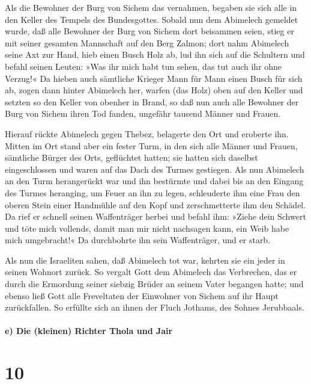 Als die Bewohner der Burg von Sichem das vernahmen,
begaben sie sich alle in den Keller des Tempels des Bundesgottes.
Sobald nun dem Abimelech gemeldet wurde, daß alle
Bewohner der Burg von Sichem dort beisammen seien, stieg
er mit seiner gesamten Mannschaft auf den Berg Zalmon; dort nahm
Abimelech seine Axt zur Hand, hieb einen Busch Holz ab, lud ihn sich auf
die Schultern und befahl seinen Leuten: »Was ihr mich habt tun sehen,
das tut auch ihr ohne Verzug!« Da hieben auch sämtliche
Krieger Mann für Mann einen Busch für sich ab, zogen dann hinter
Abimelech her, warfen (das Holz) oben auf den Keller und setzten so den
Keller von obenher in Brand, so daß nun auch alle Bewohner der Burg von
Sichem ihren Tod fanden, ungefähr tausend Männer und Frauen.

Hierauf rückte Abimelech gegen Thebez, belagerte den Ort
und eroberte ihn. Mitten im Ort stand aber ein fester
Turm, in den sich alle Männer und Frauen, sämtliche Bürger des Orts,
geflüchtet hatten; sie hatten sich daselbst eingeschlossen und waren auf
das Dach des Turmes gestiegen. Als nun Abimelech an den
Turm herangerückt war und ihn bestürmte und dabei bis an den Eingang des
Turmes heranging, um Feuer an ihn zu legen, schleuderte
ihm eine Frau den oberen Stein einer Handmühle auf den Kopf und
zerschmetterte ihm den Schädel. Da rief er schnell seinen
Waffenträger herbei und befahl ihm: »Ziehe dein Schwert und töte mich
vollends, damit man mir nicht nachsagen kann, ein Weib habe mich
umgebracht!« Da durchbohrte ihn sein Waffenträger, und er starb.

Als nun die Israeliten sahen, daß Abimelech tot war,
kehrten sie ein jeder in seinen Wohnort zurück. So
vergalt Gott dem Abimelech das Verbrechen, das er durch die Ermordung
seiner siebzig Brüder an seinem Vater begangen hatte; und
ebenso ließ Gott alle Freveltaten der Einwohner von Sichem auf ihr Haupt
zurückfallen. So erfüllte sich an ihnen der Fluch Jothams, des Sohnes
Jerubbaals.

\hypertarget{e-die-kleinen-richter-thola-und-jair}{%
\paragraph{e) Die (kleinen) Richter Thola und
Jair}\label{e-die-kleinen-richter-thola-und-jair}}

\hypertarget{section-9}{%
\section{10}\label{section-9}}

